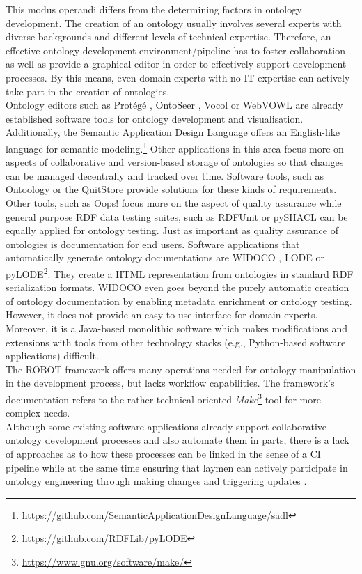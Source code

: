 \documentclass[runningheads]{llncs}
\begin{document}
This modus operandi differs from the determining factors in ontology development. The creation of an ontology usually involves several experts with diverse backgrounds and different levels of technical expertise. Therefore, an effective ontology development environment/pipeline has to foster collaboration as well as provide a graphical editor in order to effectively support development processes. By this means, even domain experts with no IT expertise can actively take part in the creation of ontologies.\\
Ontology editors such as Protégé \cite{protege}, OntoSeer \cite{ontoseer}, Vocol \cite{halilaj} or WebVOWL \cite{lohmann} are already established software tools for ontology development and visualisation. Additionally, the Semantic Application Design Language offers an English-like language for semantic modeling.\footnote{https://github.com/SemanticApplicationDesignLanguage/sadl} Other applications in this area focus more on aspects of collaborative and version-based storage of ontologies so that changes can be managed decentrally and tracked over time. Software tools, such as Ontoology \cite{alobaid} or the QuitStore \cite{arndt} provide solutions for these kinds of requirements.\\
Other tools, such as Oops! focus more on the aspect of quality assurance \cite{poveda} while general purpose RDF data testing suites, such as RDFUnit \cite{rdfunit} or pySHACL\cite{sommer} can be equally applied for ontology testing. Just as important as quality assurance of ontologies is documentation for end users. Software applications that automatically generate ontology documentations are WIDOCO \cite{widoco}, LODE \cite{lode} or pyLODE\footnote{\url{https://github.com/RDFLib/pyLODE}}. They create a HTML representation from ontologies in standard RDF serialization formats. WIDOCO even goes beyond the purely automatic creation of ontology documentation by enabling metadata enrichment or ontology testing. However, it does not provide an easy-to-use interface for domain experts. Moreover, it is a Java-based monolithic software which makes modifications and extensions with tools from other technology stacks (e.g., Python-based software applications) difficult.\\
The ROBOT framework offers many operations needed for ontology manipulation in the development process, but lacks workflow capabilities. The framework's documentation refers to the rather technical oriented \textit{Make}\footnote{\url{https://www.gnu.org/software/make/}} tool for more complex needs.\\
Although some existing software applications already support collaborative ontology development processes and also automate them in parts, there is a lack of approaches as to how these processes can be linked in the sense of a CI pipeline while at the same time ensuring that laymen can actively participate in ontology engineering through making changes and triggering updates \cite{mungall}.
\end{document}
